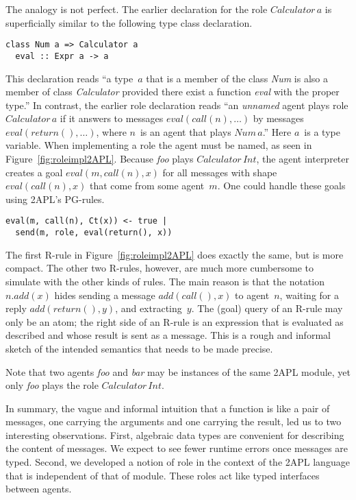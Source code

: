 \documentclass[conference,compsoc]{IEEEtran} %
\begin{document}
The analogy is not perfect. The earlier declaration for the role
$\mathit{Calculator}\,a$ is superficially similar to the following type
class declaration.
\begin{lstlisting}[style=hs]
class Num a => Calculator a
  eval :: Expr a -> a
\end{lstlisting}
This declaration reads ``a type~$a$ that is a member of the class
\textit{Num} is also a member of class \textit{Calculator} provided there
exist a function \textit{eval} with the proper type.'' In contrast, the
earlier role declaration reads ``an \emph{unnamed} agent plays role
$\mathit{Calculator}\,a$ if it answers to messages
$\mathit{eval}(\mathit{call}(n),\ldots)$ by messages
$\mathit{eval}(\mathit{return}(),\ldots)$, where $n$~is an agent that plays
$\mathit{Num}\,a$.'' Here $a$~is a type variable.  When implementing a role
the agent must be named, as seen in Figure~\ref{fig:roleimpl2APL}. Because
\textit{foo} plays $\mathit{Calculator}\,\mathit{Int}$, the agent
interpreter creates a goal $\mathit{eval}(m,\mathit{call}(n),x)$ for all
messages with shape $\mathit{eval}(\mathit{call}(n),x)$ that come from some
agent~$m$.  One could handle these goals using 2APL's PG-rules.
\begin{lstlisting}[style=me]
eval(m, call(n), Ct(x)) <- true |
  send(m, role, eval(return(), x))
\end{lstlisting}
The first R-rule in Figure~\ref{fig:roleimpl2APL} does exactly the same,
but is more compact. The other two R-rules, however, are much more
cumbersome to simulate with the other kinds of rules. The main reason is
that the notation $n.\mathit{add}(x)$ hides sending a message
$\mathit{add}(\mathit{call}(),x)$ to agent~$n$, waiting for a reply
$\mathit{add}(\mathit{return}(),y)$, and extracting~$y$. The (goal) query
of an R-rule may only be an atom; the right side of an R-rule is an
expression that is evaluated as described and whose result is sent as a
message.  This is a rough and informal sketch of the intended semantics
that needs to be made precise.

Note that two agents \textit{foo} and \textit{bar} may be instances of the
same 2APL module, yet only \textit{foo} plays the role
$\mathit{Calculator}\,\mathit{Int}$.

In summary, the vague and informal intuition that a function is like a pair
of messages, one carrying the arguments and one carrying the result, led
us to two interesting observations. First, algebraic data types are
convenient for describing the content of messages. We expect to see fewer
runtime errors once messages are typed. Second, we developed a notion of
role in the context of the 2APL language that is independent of that of
module. These roles act like typed interfaces between agents. 
\end{document}
